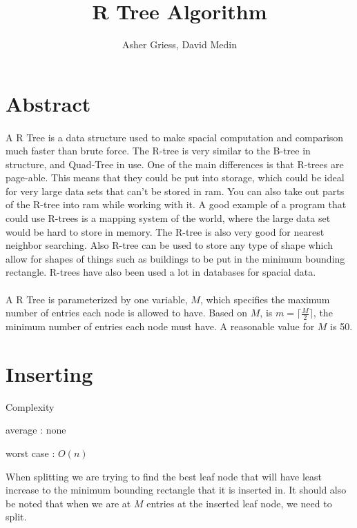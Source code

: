 \documentclass{article}
\author{Asher Griess, David Medin}
\title{R Tree Algorithm}
\begin{document}
\maketitle



\section{Abstract}
\paragraph{}
A R Tree is a data structure used to make spacial computation and comparison much faster than brute force.
The R-tree is very similar to the B-tree in structure, and Quad-Tree in use. One of the main differences is that
R-trees are page-able. This means that they could be put into storage, which could be ideal for very large data sets 
that can't be stored in ram.  You can also take out parts of the R-tree into ram while working with it. A good example
of a program that could use R-trees is a mapping system of the world, where the large data set would be hard to store in memory.
The R-tree is also very good for nearest neighbor searching. Also R-tree can be used to store any type of shape which allow for shapes
of things such as buildings to be put in the minimum bounding rectangle. R-trees have also been used a lot in databases for spacial data.
\paragraph{}
A R Tree is parameterized by one variable, $M$, which specifies the maximum number of entries each node is allowed to have. Based on $M$, is $m = \lceil\frac{M}{2}\rceil$, the minimum number of entries each node must have. A reasonable value for $M$ is 50. \cite{guttman_1984_rtrees}

  

\section{Inserting}
Complexity

average : none

worst case : $O(n)$

When splitting we are trying to find the best leaf node
that will have least increase to the minimum bounding rectangle that it is inserted in.
It should also be noted that when we are at $M$ entries at the inserted leaf node, we
need to split.
\end{document}
